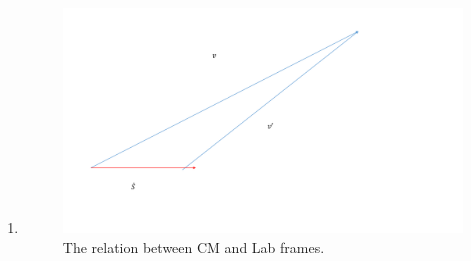 \documentclass[fleqn, 12pt]{article}
\begin{document}
\begin{enumerate}

\item
  \begin{figure}
    \includegraphics[width=\textwidth]{hw3-comlab.pdf}
    \caption{The relation between CM and Lab frames.}
    \label{fig:comlab}
  \end{figure}


\end{enumerate}
\end{document}
